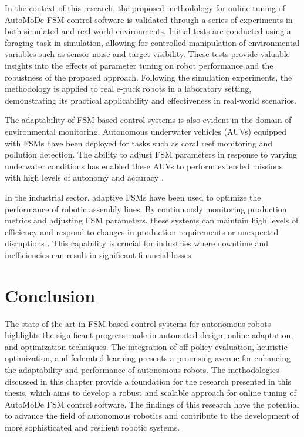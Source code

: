 \documentclass{ULBreport}
\begin{document}
In the context of this research, the proposed methodology for online tuning of AutoMoDe FSM control software is validated through a series of experiments in both simulated and real-world environments. Initial tests are conducted using a foraging task in simulation, allowing for controlled manipulation of environmental variables such as sensor noise and target visibility. These tests provide valuable insights into the effects of parameter tuning on robot performance and the robustness of the proposed approach. Following the simulation experiments, the methodology is applied to real e-puck robots in a laboratory setting, demonstrating its practical applicability and effectiveness in real-world scenarios.

The adaptability of FSM-based control systems is also evident in the domain of environmental monitoring. Autonomous underwater vehicles (AUVs) equipped with FSMs have been deployed for tasks such as coral reef monitoring and pollution detection. The ability to adjust FSM parameters in response to varying underwater conditions has enabled these AUVs to perform extended missions with high levels of autonomy and accuracy \cite{Al-Khatib2019}.

In the industrial sector, adaptive FSMs have been used to optimize the performance of robotic assembly lines. By continuously monitoring production metrics and adjusting FSM parameters, these systems can maintain high levels of efficiency and respond to changes in production requirements or unexpected disruptions \cite{Srinivasan2018}. This capability is crucial for industries where downtime and inefficiencies can result in significant financial losses.

\section{Conclusion}
The state of the art in FSM-based control systems for autonomous robots highlights the significant progress made in automated design, online adaptation, and optimization techniques. The integration of off-policy evaluation, heuristic optimization, and federated learning presents a promising avenue for enhancing the adaptability and performance of autonomous robots. The methodologies discussed in this chapter provide a foundation for the research presented in this thesis, which aims to develop a robust and scalable approach for online tuning of AutoMoDe FSM control software. The findings of this research have the potential to advance the field of autonomous robotics and contribute to the development of more sophisticated and resilient robotic systems.
\end{document}
